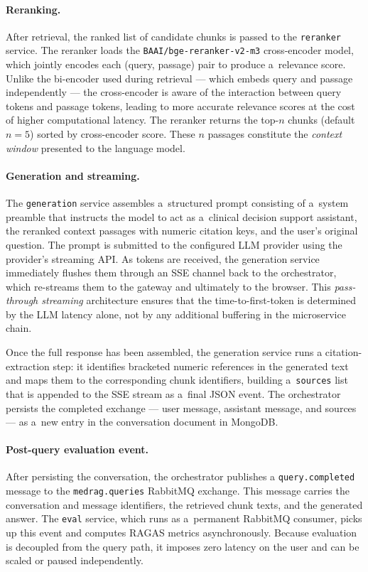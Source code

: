 \paragraph{Reranking.}
After retrieval, the ranked list of candidate chunks is passed to the
\texttt{reranker} service.  The reranker loads the
\texttt{BAAI/bge-reranker-v2-m3} cross-encoder model, which jointly encodes
each (query, passage) pair to produce a~relevance score.  Unlike the
bi-encoder used during retrieval --- which embeds query and passage
independently --- the cross-encoder is aware of the interaction between
query tokens and passage tokens, leading to more accurate relevance scores
at the cost of higher computational latency.  The reranker returns the
top-$n$ chunks (default $n = 5$) sorted by cross-encoder score.
These $n$ passages constitute the \emph{context window} presented to the
language model.

\paragraph{Generation and streaming.}
The \texttt{generation} service assembles a~structured prompt consisting of
a~system preamble that instructs the model to act as a~clinical decision
support assistant, the reranked context passages with numeric citation keys,
and the user's original question.  The prompt is submitted to the configured
LLM provider using the provider's streaming API.  As tokens are received, the
generation service immediately flushes them through an SSE channel back to the
orchestrator, which re-streams them to the gateway and ultimately to the
browser.  This \emph{pass-through streaming} architecture ensures that the
time-to-first-token is determined by the LLM latency alone, not by any
additional buffering in the microservice chain.

Once the full response has been assembled, the generation service runs a
citation-extraction step: it identifies bracketed numeric references in the
generated text and maps them to the corresponding chunk identifiers, building
a~\texttt{sources} list that is appended to the SSE stream as a~final JSON
event.  The orchestrator persists the completed exchange --- user message,
assistant message, and sources --- as a~new entry in the conversation document
in MongoDB.

\paragraph{Post-query evaluation event.}
After persisting the conversation, the orchestrator publishes a
\texttt{query.completed} message to the \texttt{medrag.queries} RabbitMQ
exchange.  This message carries the conversation and message identifiers,
the retrieved chunk texts, and the generated answer.  The \texttt{eval}
service, which runs as a~permanent RabbitMQ consumer, picks up this event
and computes RAGAS metrics asynchronously.  Because evaluation is decoupled
from the query path, it imposes zero latency on the user and can be scaled
or paused independently.

